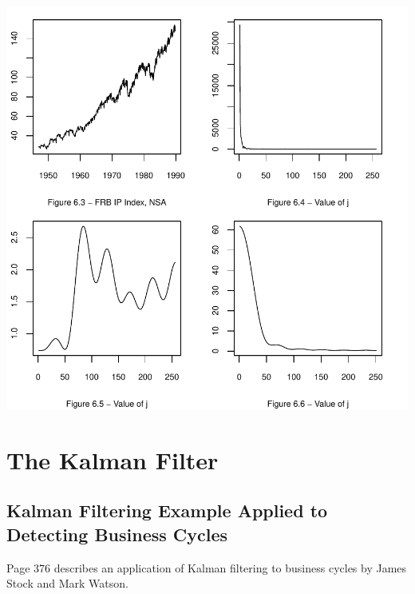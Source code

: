 \documentclass[a4paper]{article}
\renewcommand{\~}{\perispomeni}%
\begin{document}
\begin{center}
\includegraphics{Companion-031}
\end{center}

\section{The Kalman Filter}
\subsection{Kalman Filtering Example Applied to Detecting Business Cycles}
Page 376 describes an application of Kalman filtering to business cycles by James Stock and Mark Watson.
\end{document}
